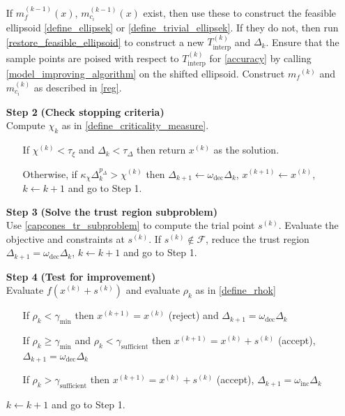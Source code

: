 \documentclass{article}
\theoremstyle{case}
\numberwithin{theorem}{subsection}
\newcommand{\chik}{{\chi^{(k)}}}
\newcommand{\dk}{\Delta_k}
\newcommand{\feasible}{{\mathcal F}}
\newcommand{\gammabi}{\gamma_{\textrm{sufficient}}}
\newcommand{\gammasm}{\gamma_{\textrm{min}}}
\newcommand{\mcik}{{{m}^{(k)}_{c_i}}}
\newcommand{\mfk}{{{m}_f}^{(k)}}
\newcommand{\omegadec}{\omega_{\text{dec}}}
\newcommand{\omegainc}{\omega_{\text{inc}}}
\newcommand{\rk}{\rho_k}
\newcommand{\sampletrk}{{T_{\text{interp}}^{(k)}}}
\newcommand{\sk}{{{s}^{(k)}}}
\newcommand{\xkpo}{{{x}^{(k+1)}}}
\newcommand{\xk}{{x^{(k)}}}
\begin{document}
\begin{algorithm}[H]
\begin{itemize}
        
	    If $m_{f}^{(k-1)}(x)$, $m_{c_i}^{(k-1)}(x)$ exist, then use these to construct the feasible ellipsoid \cref{define_ellipsek} or \cref{define_trivial_ellipsek}.
	    If they do not, then run \cref{restore_feasible_ellipsoid} to construct a new $\sampletrk$ and $\dk$.
            Ensure that the sample points are poised with respect to $ \sampletrk $ for \cref{accuracy} by calling \cref{model_improving_algorithm} on the shifted ellipsoid.
            Construct $\mfk$ and $\mcik$ as described in \cref{reg}.
        
        \item[\textbf{Step 2}] \textbf{(Check stopping criteria)} \\
            Compute $\chi_k$ as in \cref{define_criticality_measure}. \begin{itemize}
                \item[] If $ \chik < \tau_{\xi} $ and $\dk <\tau_{\Delta}$ then return $\xk$ as the solution.
                \item[] Otherwise, if $\kappa_{\chi} \dk^{p_{\Delta}} > \chik$ then 
                $\Delta_{k+1} \gets \omegadec\dk$, 
                $x^{(k+1)} \gets \xk$,
                $k \gets k+1$ and go to Step 1.
            \end{itemize}
        
        \item[\textbf{Step 3}] \textbf{(Solve the trust region subproblem)} \\
        	Use \cref{capcones_tr_subproblem} to compute the trial point $\sk$.
        	Evaluate the objective and constraints at $\sk$.
        	If $\sk \not \in \feasible$, reduce the trust region $\Delta_{k+1} = \omegadec\dk$, $k \gets k+1$ and go to Step 1.
            
        \item[\textbf{Step 4}] \textbf{(Test for improvement)} \\
            Evaluate $f(\xk + \sk)$ and evaluate $\rk$ as in \cref{define_rhok} \begin{itemize}
                \item[] If $\rk < \gammasm$ then $\xkpo=\xk$ (reject) and $\Delta_{k+1} = \omegadec\dk$
                \item[] If $\rk \ge \gammasm$ and $\rk < \gammabi$ then $\xkpo=\xk+\sk$ (accept), $\Delta_{k+1} = \omegadec\dk$
                \item[] If $\rk > \gammabi$ then $\xkpo=\xk+\sk$ (accept), $\Delta_{k+1} = \omegainc\dk$
            \end{itemize}
            $k \gets k+1$ and go to Step 1.
    \end{itemize}
\end{algorithm}
\end{document}

